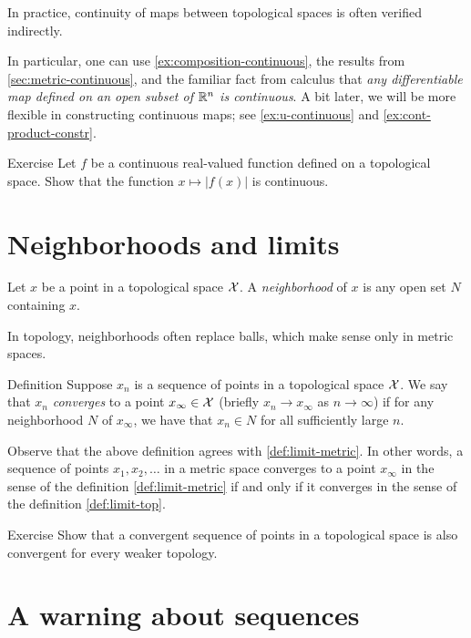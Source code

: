 In practice, continuity of maps between topological spaces is often verified indirectly.

In particular, one can use \ref{ex:composition-continuous}, the results from \ref{sec:metric-continuous}, and the familiar fact from calculus that \textit{any differentiable map defined on an open subset of $\mathbb{R}^n$ is continuous}.
A bit later, we will be more flexible in constructing continuous maps; see \ref{ex:u-continuous} and \ref{ex:cont-product-constr}.

\begin{thm}{Exercise}\label{ex:|x|}
Let $f$ be a continuous real-valued function defined on a topological space.
Show that the function $x\mapsto |f(x)|$ is continuous.
\end{thm}

\section{Neighborhoods and limits}


Let $x$ be a point in a topological space $\mathcal{X}$.
A \emph{neighborhood} of $x$ is any open set $N$ containing $x$.

In topology, neighborhoods often replace balls, which make sense only in metric spaces.

\begin{thm}{Definition}\label{def:limit-top}
Suppose $x_n$ is a sequence of points in a topological space $\mathcal{X}$.
We say that $x_n$ \emph{converges} to a point $x_\infty\in \mathcal{X}$ (briefly $x_n\to x_\infty$ as $n\to\infty$) if for any neighborhood $N$ of $x_\infty$, we have that
$x_n\in N$ for all sufficiently large $n$.
\end{thm}

Observe that the above definition agrees with \ref{def:limit-metric}.
In other words, a sequence of points $x_1,x_2,\ldots$ in a metric space converges to a point $x_\infty$ in the sense of the definition \ref{def:limit-metric} if and only if it converges in the sense of the definition \ref{def:limit-top}.

\begin{thm}{Exercise}\label{ex:lim-weaker}
Show that a convergent sequence of points in a topological space is also convergent for every weaker topology.
\end{thm}


\section{A warning about sequences}\label{sec:limits}

